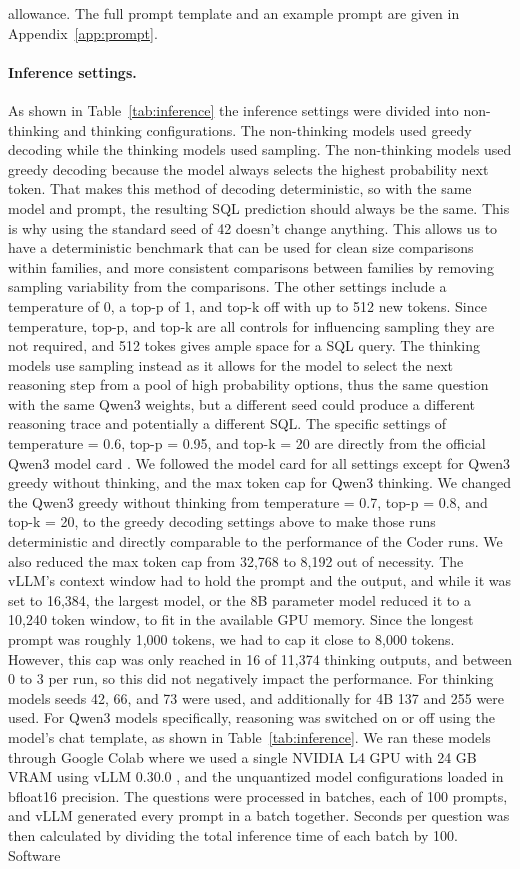allowance. The full prompt template and an example prompt are given in Appendix~\ref{app:prompt}.

\paragraph{Inference settings.}
As shown in Table~\ref{tab:inference} the inference settings were divided into non-thinking and thinking configurations. The non-thinking models used greedy decoding while the thinking models used sampling. The non-thinking models used greedy decoding because the model always selects the highest probability next token. That makes this method of decoding deterministic, so with the same model and prompt, the resulting SQL prediction should always be the same. This is why using the standard seed of 42 doesn’t change anything. This allows us to have a deterministic benchmark that can be used for clean size comparisons within families, and more consistent comparisons between families by removing sampling variability from the comparisons. The other settings include a temperature of 0, a top-p of 1, and top-k off with up to 512 new tokens. Since temperature, top-p, and top-k are all controls for influencing sampling they are not required, and 512 tokes gives ample space for a SQL query. The thinking models use sampling instead as it allows for the model to select the next reasoning step from a pool of high probability options, thus the same question with the same Qwen3 weights, but a different seed could produce a different reasoning trace and potentially a different SQL. The specific settings of temperature = 0.6, top-p = 0.95, and top-k = 20 are directly from the official Qwen3 model card \citep{qwen2025qwen3card,yang2025qwen3}. We followed the model card for all settings except for Qwen3 greedy without thinking, and the max token cap for Qwen3 thinking. We changed the Qwen3 greedy without thinking from temperature = 0.7, top-p = 0.8, and top-k = 20, to the greedy decoding settings above to make those runs deterministic and directly comparable to the performance of the Coder runs. We also reduced the max token cap from 32,768 to 8,192 out of necessity. The vLLM’s context window had to hold the prompt and the output, and while it was set to 16,384, the largest model, or the 8B parameter model reduced it to a 10,240 token window, to fit in the available GPU memory. Since the longest prompt was roughly 1,000 tokens, we had to cap it close to 8,000 tokens. However, this cap was only reached in 16 of 11,374 thinking outputs, and between 0 to 3 per run, so this did not negatively impact the performance. For thinking models seeds 42, 66, and 73 were used, and additionally for 4B 137 and 255 were used. For Qwen3 models specifically, reasoning was switched on or off using the model’s chat template, as shown in Table~\ref{tab:inference}. We ran these models through Google Colab where we used a single NVIDIA L4 GPU with 24 GB VRAM using vLLM 0.30.0 \citep{kwon2023vllm}, and the unquantized model configurations loaded in bfloat16 precision. The questions were processed in batches, each of 100 prompts, and vLLM generated every prompt in a batch together. Seconds per question was then calculated by dividing the total inference time of each batch by 100. Software 
